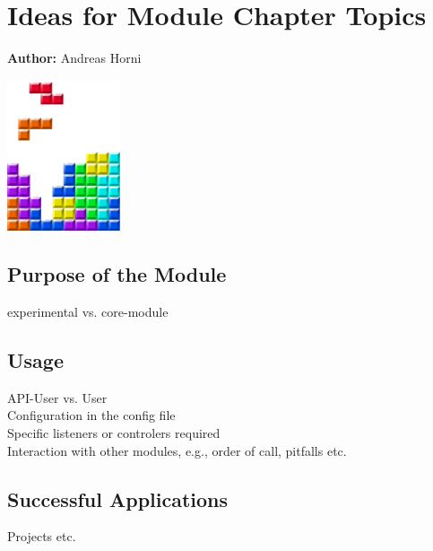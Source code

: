 \chapter*{Ideas for Module Chapter Topics}
\label{ch:tmp_module}

\hfill \textbf{Author:} Andreas Horni

\begin{center} \includegraphics[width=0.25\textwidth, angle=0]{figures/MATSimBook.png} \end{center}

\section{Purpose of the Module}
experimental vs. core-module

\section{Usage}
API-User vs. User \\

Configuration in the config file \\

Specific listeners or controlers required \\

Interaction with other modules, e.g., order of call, pitfalls etc. \\

\section{Successful Applications}
Projects etc. \\

